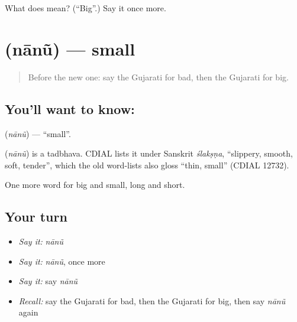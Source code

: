\begin{tcolorbox}[breakable,colback=teal!4,colframe=teal!35!black,title={Before you move on}]
What does  mean? (\textquotedblleft{}Big\textquotedblright{}.) Say it once more.
\end{tcolorbox}
\section[\texorpdfstring{\gu{નાનું} (nānũ)}{નાનું (nānũ)}]{ (nānũ) — small}

\label{lesson:GU-C72-small}



\begin{quote}
Before the new one: say the Gujarati for bad, then the Gujarati for big.
\end{quote}

\subsection*{You'll want to know: }
\textbf{} (\emph{nānũ}) — \textquotedblleft{}small\textquotedblright{}.

\begin{cousinweb}
\textbf{} (\emph{nānũ}) is a tadbhava. CDIAL lists it under Sanskrit \emph{ślakṣṇa}, \textquotedblleft{}slippery, smooth, soft, tender\textquotedblright{}, which the old word-lists also gloss \textquotedblleft{}thin, small\textquotedblright{} (CDIAL 12732).
\end{cousinweb}

\begin{grammarlens}[title={What you've built}]
One more word for big and small, long and short.
\end{grammarlens}

\subsection*{Your turn}
\begin{itemize}
\raggedright
  \item \emph{Say it:} \emph{nānũ}
  \item \emph{Say it:} \emph{nānũ}, once more
  \item \emph{Say it:} say \emph{nānũ}
  \item \emph{Recall:} say the Gujarati for bad, then the Gujarati for big, then say \emph{nānũ} again
\end{itemize}


